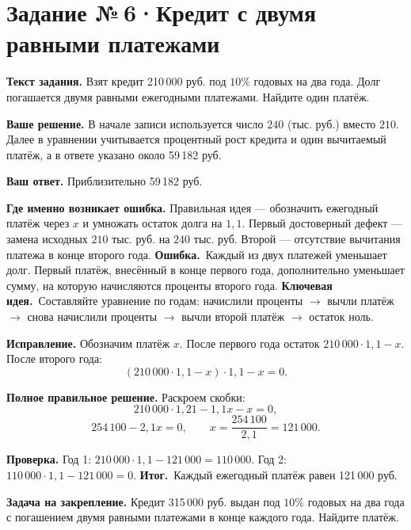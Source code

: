 \documentclass[a4paper,11pt]{article}
\newcommand{\err}{\textcolor{red!75!black}{\textbf{Ошибка.}}\ }
\newcommand{\idea}{\textcolor{accent}{\textbf{Ключевая идея.}}\ }
\newcommand{\result}{\textcolor{accent}{\textbf{Итог.}}\ }
\newcommand{\task}[2]{\clearpage\phantomsection\label{task:#1}\section*{Задание №\,#1\;·\;#2}}
\newcommand{\labelp}[1]{\par\smallskip\textbf{#1.}\enspace}
\begin{document}
\task{6}{Кредит с двумя равными платежами}
\labelp{Текст задания} Взят кредит 210\,000 руб. под $10\%$ годовых на два года. Долг погашается двумя равными ежегодными платежами. Найдите один платёж.
\labelp{Ваше решение} В начале записи используется число $240$ (тыс. руб.) вместо $210$. Далее в уравнении учитывается процентный рост кредита и один вычитаемый платёж, а в ответе указано около 59\,182 руб.
\labelp{Ваш ответ} Приблизительно 59\,182 руб.
\labelp{Где именно возникает ошибка} Правильная идея --- обозначить ежегодный платёж через $x$ и умножать остаток долга на $1{,}1$. Первый достоверный дефект --- замена исходных $210$ тыс. руб. на $240$ тыс. руб. Второй --- отсутствие вычитания платежа в конце второго года.
\err Каждый из двух платежей уменьшает долг. Первый платёж, внесённый в конце первого года, дополнительно уменьшает сумму, на которую начисляются проценты второго года.
\idea Составляйте уравнение по годам: начислили проценты $\rightarrow$ вычли платёж $\rightarrow$ снова начислили проценты $\rightarrow$ вычли второй платёж $\rightarrow$ остаток ноль.
\labelp{Исправление} Обозначим платёж $x$. После первого года остаток $210\,000\cdot1{,}1-x$. После второго года:
\[(210\,000\cdot1{,}1-x)\cdot1{,}1-x=0.\]
\labelp{Полное правильное решение} Раскроем скобки:
\[210\,000\cdot1{,}21-1{,}1x-x=0,\]
\[254\,100-2{,}1x=0,\qquad x=\frac{254\,100}{2{,}1}=121\,000.\]
\labelp{Проверка} Год 1: $210\,000\cdot1{,}1-121\,000=110\,000$. Год 2: $110\,000\cdot1{,}1-121\,000=0$.
\result Каждый ежегодный платёж равен 121\,000 руб.
\labelp{Задача на закрепление} Кредит 315\,000 руб. выдан под $10\%$ годовых на два года с погашением двумя равными платежами в конце каждого года. Найдите платёж.
\end{document}
